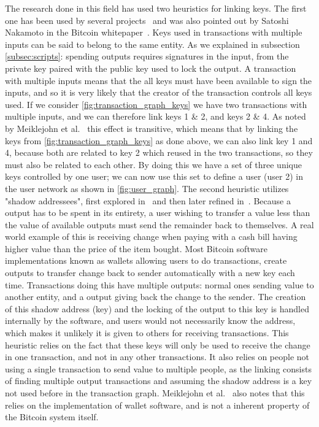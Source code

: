 The research done in this field has used two heuristics for linking keys. The first one has been used by several projects~\cite{reid2013analysis,meiklejohn2013fistful,androulaki2013evaluating,ron2013quantitative} and was also pointed out by Satoshi Nakamoto in the Bitcoin whitepaper~\cite{nakamoto2008bitcoin}. Keys used in transactions with multiple inputs can be said to belong to the same entity. As we explained in subsection \cref{subsec:scripts}: spending outputs requires signatures in the input, from the private key paired with the public key used to lock the output. A transaction with multiple inputs means that the all keys must have been available to sign the inputs, and so it is very likely that the creator of the transaction controls all keys used. If we consider \cref{fig:transaction_graph_keys} we have two transactions with multiple inputs, and we can therefore link keys 1 \& 2, and keys 2 \& 4. As noted by Meiklejohn et al.~\cite{meiklejohn2013fistful} this effect is transitive, which means that by linking the keys from \cref{fig:transaction_graph_keys} as done above, we can also link key 1 and 4, because both are related to key 2 which reused in the two transactions, so they must also be related to each other. By doing this we have a set of three unique keys controlled by one user; we can now use this set to define a user (user 2) in the user network as shown in \cref{fig:user_graph}. The second heuristic utilizes "shadow addressees", first explored in~\cite{androulaki2013evaluating} and then later refined in~\cite{meiklejohn2013fistful}. Because a output has to be spent in its entirety, a user wishing to transfer a value less than the value of available outputs must send the remainder back to themselves. A real world example of this is receiving change when paying with a cash bill having higher value than the price of the item bought. Most Bitcoin software implementations known as wallets allowing users to do transactions, create outputs to transfer change back to sender automatically with a new key each time. Transactions doing this have multiple outputs: normal ones sending value to another entity, and a output giving back the change to the sender. The creation of this shadow address (key) and the locking of the output to this key is handled internally by the software, and users would not necessarily know the address, which makes it unlikely it is given to others for receiving transactions. This heuristic relies on the fact that these keys will only be used to receive the change in one transaction, and not in any other transactions. It also relies on people not using a single transaction to send value to multiple people, as the linking consists of finding multiple output transactions and assuming the shadow address is a key not used before in the transaction graph. Meiklejohn et al.~\cite{meiklejohn2013fistful} also notes that this relies on the implementation of wallet software, and is not a inherent property of the Bitcoin system itself. 
